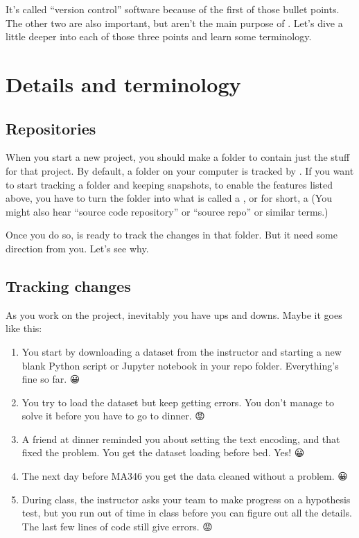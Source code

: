 \documentclass[letterpaper,10pt,english]{sphinxmanual}
\begin{document}
It’s called “version control” software because of the first of those bullet points.  The other two are also important, but aren’t the main purpose of .  Let’s dive a little deeper into each of those three points and learn some terminology.


\section{Details and terminology}
\label{\detokenize{chapter-8-version-control:details-and-terminology}}

\subsection{Repositories}
\label{\detokenize{chapter-8-version-control:repositories}}
When you start a new project, you should make a folder to contain just the stuff for that project.  By default, a folder on your computer is  tracked by .  If you want  to start tracking a folder and keeping snapshots, to enable the features listed above, you have to turn the folder into what is called a , or for short, a   (You might also hear “source code repository” or “source repo” or similar terms.)

Once you do so,  is ready to track the changes in that folder.  But it need some direction from you.  Let’s see why.


\subsection{Tracking changes}
\label{\detokenize{chapter-8-version-control:tracking-changes}}
As you work on the project, inevitably you have ups and downs.  Maybe it goes like this:
\begin{enumerate}
%
\item {} 
You start by downloading a dataset from the instructor and starting a new blank Python script or Jupyter notebook in your repo folder.  Everything’s fine so far.  😀

\item {} 
You try to load the dataset but keep getting errors.  You don’t manage to solve it before you have to go to dinner.  😡

\item {} 
A friend at dinner reminded you about setting the text encoding, and that fixed the problem.  You get the dataset loading before bed.  Yes!  😀

\item {} 
The next day before MA346 you get the data cleaned without a problem.  😀

\item {} 
During class, the instructor asks your team to make progress on a hypothesis test, but you run out of time in class before you can figure out all the details.  The last few lines of code still give errors.  😡

\end{enumerate}
\end{document}

